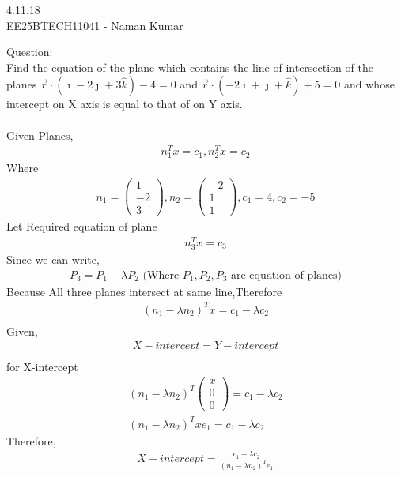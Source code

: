 \documentclass[journal]{IEEEtran}
\author{EE25BTECH11041-Naman Kumar }
\begin{document}
\begin{center}
    \huge{4.11.18}\\
    \large{EE25BTECH11041 - Naman Kumar}
\end{center}
Question:\\
Find the equation of the plane which contains the line of intersection of the planes $\vec{r}\cdot(\imath-2\jmath+3\hat{k})-4=0$ and  $\vec{r}\cdot(-2\imath+\jmath+\hat{k})+5=0$ and whose intercept on X axis is equal to that of on Y axis.\\
\solution \\
Given Planes,
\begin{align}
    n_1^Tx=c_1,n_2^Tx=c_2
\end{align}
Where
\begin{align}
n_1=\begin{pmatrix}1\\-2\\3\end{pmatrix},n_2=\begin{pmatrix}-2\\1\\1\end{pmatrix},c_1=4,c_2=-5
\end{align}
Let Required equation of plane
\begin{align}
    n_3^Tx=c_3
\end{align}
Since we can write,
\begin{align}
P_3=P_1-\lambda P_2 \text{ (Where $P_1,P_2,P_3$ are equation of planes)}
\end{align}
Because All three planes intersect at same line,Therefore
\begin{align}
    (n_1-\lambda n_2)^Tx=c_1-\lambda c_2\\
\end{align}
Given,
\begin{align}
    X-intercept=Y-intercept\\
\end{align}
for X-intercept
\begin{align}
    (n_1-\lambda n_2)^T\begin{pmatrix}x\\0\\0\end{pmatrix}=c_1-\lambda c_2\\
    (n_1-\lambda n_2)^Txe_1=c_1-\lambda c_2
\end{align}
Therefore,
\begin{align}
    X-intercept= \frac{c_1-\lambda c_2}{(n_1-\lambda n_2)^Te_1}\label{1}
\end{align}
\end{document}
